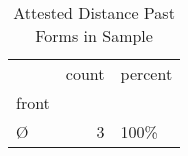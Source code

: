 \begin{table}[htbp!]
\centering
\caption{Attested Distance Past Forms in Sample}
\label{table:distpast_front}
\begin{tabular}{lrl}
\toprule
{} &  count & percent \\
front          &        &         \\
\midrule
\texthebrew{Ø} &      3 &    100\% \\
\bottomrule
\end{tabular}
\end{table}
